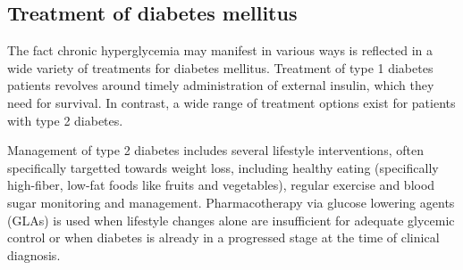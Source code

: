 


\subsection{Treatment of diabetes mellitus} \label{intro:treatment}
The fact chronic hyperglycemia may manifest in various ways is reflected in a wide variety of treatments for diabetes mellitus. Treatment of type 1 diabetes patients revolves around timely administration of external insulin, which they need for survival. In contrast, a wide range of treatment options exist for patients with type 2 diabetes.

Management of type 2 diabetes includes several lifestyle interventions, often specifically targetted towards weight loss, including healthy eating (specifically high-fiber, low-fat foods like fruits and vegetables), regular exercise and blood sugar monitoring and management. Pharmacotherapy via glucose lowering agents (GLAs) is used when lifestyle changes alone are insufficient for adequate glycemic control or when diabetes is already in a progressed stage at the time of clinical diagnosis. 

